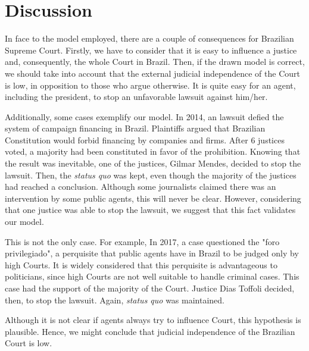 \documentclass[12pt, a4paper]{article}
\begin{document}
 

\section{Discussion}

In face to the model employed, there are a couple of consequences for Brazilian Supreme Court. Firstly, we have to consider that it is easy to influence a justice and, consequently, the whole Court in Brazil. Then, if the drawn model is correct, we should take into account that the external judicial independence of the Court is low, in opposition to those who argue otherwise. It is quite easy for an agent, including the president, to stop an unfavorable lawsuit against him/her.

Additionally, some cases exemplify our model. In 2014, an lawsuit defied the system of campaign financing in Brazil. Plaintiffs argued that Brazilian Constitution would forbid financing by companies and firms. After 6 justices voted, a majority had been constituted in favor of the prohibition. Knowing that the result was inevitable, one of the justices, Gilmar Mendes, decided to stop the lawsuit. Then, the \textit{status quo} was kept, even though the majority of the justices had reached a conclusion. Although some journalists claimed there was an intervention by some public agents, this will never be clear. However, considering that one justice was able to stop the lawsuit, we suggest that this fact validates our model.

This is not the only case. For example, In 2017, a case questioned the "foro privilegiado", a perquisite that public agents have in Brazil to be judged only by high Courts. It is widely considered that this perquisite is advantageous to politicians, since high Courts are not well suitable to handle criminal cases. This case had the support of the majority of the Court. Justice Dias Toffoli decided, then, to stop the lawsuit. Again, \textit{status quo} was maintained. 

Although it is not clear if agents always try to influence Court, this hypothesis is plausible. Hence, we might conclude that judicial independence of the Brazilian Court is low. 





\end{document}
